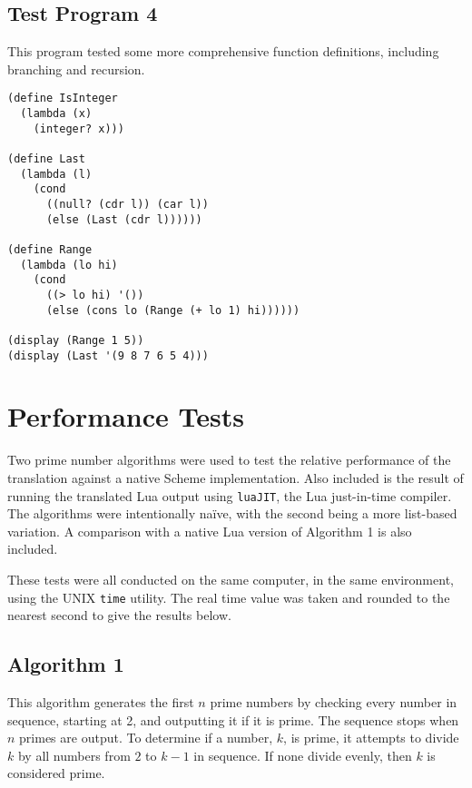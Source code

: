 \subsection{Test Program 4}
This program tested some more comprehensive function definitions, including
branching and recursion.
\begin{framed}
\begin{verbatim}
(define IsInteger
  (lambda (x)
    (integer? x)))

(define Last
  (lambda (l)
    (cond
      ((null? (cdr l)) (car l))
      (else (Last (cdr l))))))

(define Range
  (lambda (lo hi)
    (cond
      ((> lo hi) '())
      (else (cons lo (Range (+ lo 1) hi))))))

(display (Range 1 5))
(display (Last '(9 8 7 6 5 4)))
\end{verbatim}
\end{framed}


\section{Performance Tests}

Two prime number algorithms were used to test the relative performance of the
translation against a native Scheme implementation. Also included is the result
of running the translated Lua output using \texttt{luaJIT}, the Lua just-in-time
compiler. The algorithms were intentionally na\"{i}ve, with the second being
a more list-based variation. A comparison with a native Lua version of
Algorithm 1 is also included.

These tests were all conducted on the same computer, in the same environment,
using the UNIX \texttt{time} utility. The real time value was taken and rounded
to the nearest second to give the results below.

\subsection{Algorithm 1}

This algorithm generates the first $n$ prime numbers by checking every number in
sequence, starting at 2, and outputting it if it is prime. The sequence stops
when $n$ primes are output. To determine if a number, $k$, is prime, it attempts
to divide $k$ by all numbers from $2$ to $k - 1$ in sequence. If none divide
evenly, then $k$ is considered prime.

